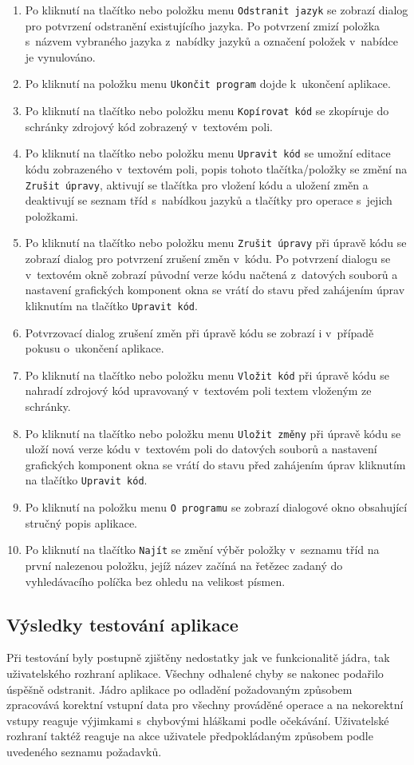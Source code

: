 \documentclass[czech,BP]{thesiskiv}
\begin{document}
\begin{enumerate}
\item{Po kliknutí na tlačítko nebo položku menu \texttt{Odstranit jazyk} se zobrazí dialog pro potvrzení odstranění existujícího jazyka. Po potvrzení zmizí položka s~názvem vybraného jazyka z~nabídky jazyků a označení položek v~nabídce je vynulováno.}
\item{Po kliknutí na položku menu \texttt{Ukončit program} dojde k~ukončení aplikace.}
\item{Po kliknutí na tlačítko nebo položku menu \texttt{Kopírovat kód} se zkopíruje do schránky zdrojový kód zobrazený v~textovém poli.}
\item{Po kliknutí na tlačítko nebo položku menu \texttt{Upravit kód} se umožní editace kódu zobrazeného v~textovém poli, popis tohoto tlačítka/položky se změní na \texttt{Zrušit úpravy}, aktivují se tlačítka pro vložení kódu a uložení změn a deaktivují se seznam tříd s~nabídkou jazyků a tlačítky pro operace s~jejich položkami.}
\item{Po kliknutí na tlačítko nebo položku menu \texttt{Zrušit úpravy} při úpravě kódu se zobrazí dialog pro potvrzení zrušení změn v~kódu. Po potvrzení dialogu se v~textovém okně zobrazí původní verze kódu načtená z~datových souborů a nastavení grafických komponent okna se vrátí do stavu před zahájením úprav kliknutím na tlačítko \texttt{Upravit kód}.} \item{Potvrzovací dialog zrušení změn při úpravě kódu se zobrazí i v~případě pokusu o~ukončení aplikace.}
\item{Po kliknutí na tlačítko nebo položku menu \texttt{Vložit kód} při úpravě kódu se nahradí zdrojový kód upravovaný v~textovém poli textem vloženým ze schránky.}
\item{Po kliknutí na tlačítko nebo položku menu \texttt{Uložit změny} při úpravě kódu se uloží nová verze kódu v~textovém poli do datových souborů a nastavení grafických komponent okna se vrátí do stavu před zahájením úprav kliknutím na tlačítko \texttt{Upravit kód}.}
\item{Po kliknutí na položku menu \texttt{O~programu} se zobrazí dialogové okno obsahující stručný popis aplikace.}
\item{Po kliknutí na tlačítko \texttt{Najít} se změní výběr položky v~seznamu tříd na první nalezenou položku, jejíž název začíná na řetězec zadaný do vyhledávacího políčka bez ohledu na velikost písmen.}
\end{enumerate}

\subsection{Výsledky testování aplikace}
Při testování byly postupně zjištěny nedostatky jak ve funkcionalitě jádra, tak uživatelského rozhraní aplikace. Všechny odhalené chyby se nakonec podařilo úspěšně odstranit. Jádro aplikace po odladění požadovaným způsobem zpracovává korektní vstupní data pro všechny prováděné operace a na nekorektní vstupy reaguje výjimkami s~chybovými hláškami podle očekávání. Uživatelské rozhraní taktéž reaguje na akce uživatele předpokládaným způsobem podle uvedeného seznamu požadavků.
\end{document}
